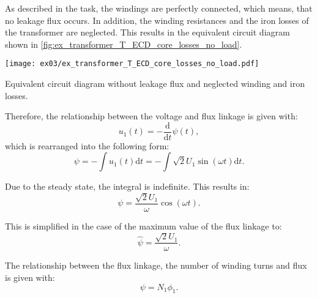 
\begin{solutionblock}
  As described in the task, the windings are perfectly connected, which means, that no leakage flux occurs. In addition, the winding resistances and the iron losses of the transformer are neglected. This results in the equivalent circuit diagram shown in \autoref{fig:ex_transformer_T_ECD_core_losses_no_load}.
  \begin{solutionfigure}[ht!]
    \centering
    \texttt{[image: ex03/ex\_transformer\_T\_ECD\_core\_losses\_no\_load.pdf]}
    \caption{Equivalent circuit diagram without leakage flux and neglected winding and iron losses.}
    \label{fig:ex_transformer_T_ECD_core_losses_no_load}
  \end{solutionfigure}


  Therefore, the relationship between the voltage and flux linkage is given with:
  \begin{equation}
    u_{\mathrm{1}}(t) = -\frac{\mathrm{d}}{\mathrm{d}t} \psi(t),
  \end{equation}
  which is rearranged into the following form:
  \begin{equation}
    \psi = - \int u_{\mathrm{1}}(t) \mathrm{d}t
    = - \int \sqrt{2} U_{\mathrm{1}} \sin(\omega t) \mathrm{d}t.
  \end{equation}

  Due to the steady state, the integral is indefinite. This results in:
  \begin{equation}
    \psi = \frac{\sqrt{2}U_{\mathrm{1}}}{\omega} \cos(\omega t).
  \end{equation}

  This is simplified in the case of the maximum value of the flux linkage to:
  \begin{equation}
    \hat{\psi} = \frac{\sqrt{2}U_{\mathrm{1}}}{\omega}.
  \end{equation}

  The relationship between the flux linkage, the number of winding turns and flux is given with:
  \begin{equation}
    \psi = N_{\mathrm{1}} \phi_{\mathrm{1}}.
  \end{equation}



\end{solutionblock}
